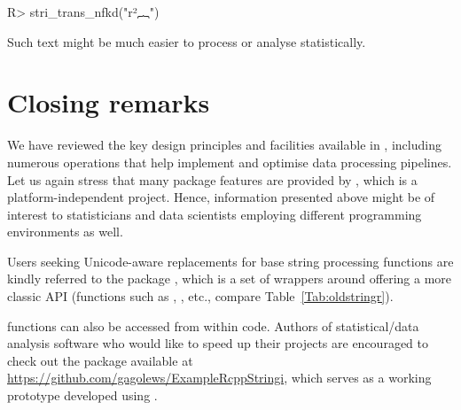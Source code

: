 \documentclass[nojss]{jss}
\begin{document}
\begin{Schunk}
\begin{Sinput}
R> stri_trans_nfkd("r²︷")
\end{Sinput}
\begin{Soutput}
[1] "r2{"
\end{Soutput}
\end{Schunk}

Such text might be much easier to process or analyse statistically.



\section{Closing remarks}\label{Sec:conclusions}



%

We have reviewed the key design principles and facilities available in
, including numerous operations
that  help implement and optimise data processing pipelines.
Let us again stress that many package features are provided by , which
is a platform-independent project. Hence, information
presented above might be of interest to statisticians and data scientists
employing different programming environments as well.



Users seeking Unicode-aware replacements for base 
string processing functions are kindly referred to the 
package \citep{stringx}, which is a set of wrappers around 
offering a more classic API
(functions such as , , etc.,
compare Table~\ref{Tab:oldstringr}).


 functions can also be accessed from within 
code. Authors of statistical/data analysis software who would like to
speed up their projects are encouraged to check out
the  package available at
\url{https://github.com/gagolews/ExampleRcppStringi},
which serves as a working prototype developed using  \citep{rcppbook}.
\end{document}
